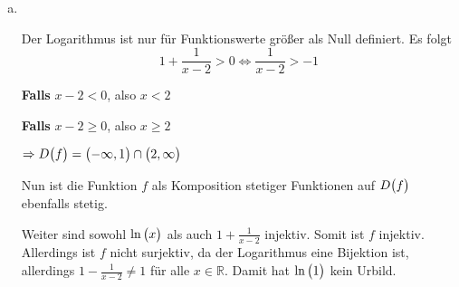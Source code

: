 \documentclass{scrreprt}
\begin{document}
\begin{enumerate}[(a)]
\newpage
\item \phantom{\null} \\

  Der Logarithmus ist nur für Funktionswerte größer als Null definiert.
  Es folgt
  \[
    1 + \frac{1}{x - 2} > 0 \iff \frac{1}{x - 2} > -1
  \]

  \begin{minipage}{.45\textwidth}
    \textbf{Falls} $x - 2 < 0$, also $x < 2$

  \end{minipage}
  \begin{minipage}{.45\textwidth}
    \textbf{Falls} $x - 2 \geq 0$, also $x \geq 2$

  \end{minipage}

  $\Rightarrow D\qty\big(f) = \qty\big(-\infty, 1) \cap \qty\big(2, \infty)$

  Nun ist die Funktion $f$ als Komposition stetiger Funktionen auf $D\qty\big(f)$
  ebenfalls stetig.

  Weiter sind sowohl $\ln\qty\big(x)$ als auch $1 + \frac{1}{x - 2}$ injektiv.
  Somit ist $f$ injektiv.
  Allerdings ist $f$ nicht surjektiv, da der Logarithmus eine Bijektion ist,
  allerdings $1 - \frac{1}{x - 2} \ne 1$ für alle $x \in \mathbb{R}$.
  Damit hat $\ln\qty\big(1)$ kein Urbild.
\end{enumerate}
\end{document}
